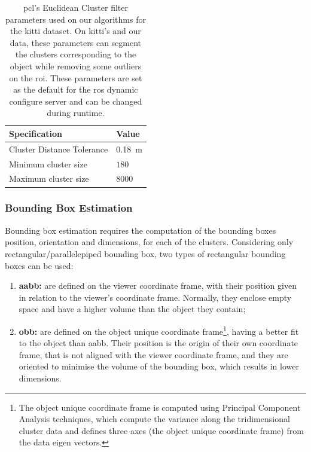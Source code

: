\begin{table}[H]
	\centering
	\renewcommand{\arraystretch}{1.2}
	\begin{tabular}{@{}p{6cm}l@{}}
	 \toprule
	 Specification & Value \\
	 \midrule
	 Cluster Distance Tolerance & \SI{0.18}{\meter}\footnotemark \\
	 Minimum cluster size & $180$ \\
	 Maximum cluster size & $8000$ \\
	 \bottomrule
	\end{tabular}
	\caption[\acs{pcl}'s Euclidian Cluster filter parameters for \acs{kitti} dataset.]{\ac{pcl}'s Euclidean Cluster filter parameters used on our algorithms for the \ac{kitti} dataset. On \ac{kitti}'s and our data, these parameters can segment the clusters corresponding to the object while removing some outliers on the \ac{roi}. These parameters are set as the default for the \ac{ros} dynamic configure server and can be changed during runtime.}
	\label{tab:euclidian-cluster-specs}
\end{table}


\subsubsection{Bounding Box Estimation}
\label{subsubsec:object-detection:bounding-box-estimation}
Bounding box estimation requires the computation of the bounding boxes position, orientation and dimensions, for each of the clusters. Considering only rectangular/parallelepiped bounding box, two types of rectangular bounding boxes can be used:

\begin{enumerate}
	\item \textbf{\acf{aabb}:} are defined on the viewer coordinate frame, with their position given in relation to the viewer's coordinate frame. Normally, they enclose empty space and have a higher volume than the object they contain;
	\item \textbf{\acf{obb}:} are defined on the object unique coordinate frame\footnote{The object unique coordinate frame is computed using Principal Component Analysis techniques, which compute the variance along the tridimensional cluster data and defines three axes (the object unique coordinate frame) from the data eigen vectors.}, having a better fit to the object than \ac{aabb}. Their position is the origin of their own coordinate frame, that is not aligned with the viewer coordinate frame, and they are oriented to minimise the volume of the bounding box, which results in lower dimensions.
\end{enumerate}

